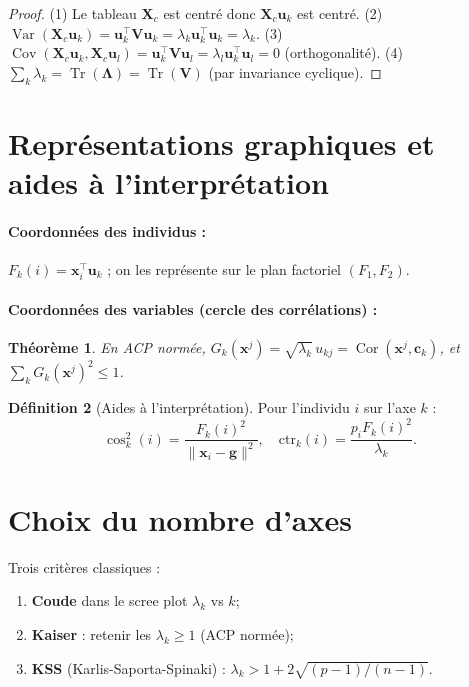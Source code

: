 \documentclass[11pt, a4paper, openany]{book}
\theoremstyle{plain}
\newtheorem{theorem}{Théorème}[chapter]
\theoremstyle{definition}
\newtheorem{definition}[theorem]{Définition}
\theoremstyle{remark}
\newcommand{\1}{\mathds{1}}
\DeclareMathOperator{\Tr}{Tr}
\DeclareMathOperator{\Var}{Var}
\DeclareMathOperator{\Cov}{Cov}
\DeclareMathOperator{\Cor}{Cor}
\newcommand{\X}{\mathbf{X}}
\newcommand{\V}{\mathbf{V}}
\newcommand{\bLambda}{\mathbf{\Lambda}}
\begin{document}
\begin{proof}
(1) Le tableau $\X_c$ est centré donc $\X_c \mathbf{u}_k$ est centré.
(2) $\Var(\X_c \mathbf{u}_k) = \mathbf{u}_k^\top \V \mathbf{u}_k = \lambda_k \mathbf{u}_k^\top \mathbf{u}_k = \lambda_k$.
(3) $\Cov(\X_c \mathbf{u}_k, \X_c \mathbf{u}_l) = \mathbf{u}_k^\top \V \mathbf{u}_l = \lambda_l \mathbf{u}_k^\top \mathbf{u}_l = 0$ (orthogonalité).
(4) $\sum_k \lambda_k = \Tr(\bLambda) = \Tr(\V)$ (par invariance cyclique).
\end{proof}

\section{Représentations graphiques et aides à l'interprétation}

\paragraph{Coordonnées des individus :}
$F_k(i) = \mathbf{x}_i^\top \mathbf{u}_k$ ; on les représente sur le plan factoriel $(F_1, F_2)$.

\paragraph{Coordonnées des variables (cercle des corrélations) :}

\begin{theorem}
En ACP normée, $G_k(\mathbf{x}^j) = \sqrt{\lambda_k}\, u_{kj} = \Cor(\mathbf{x}^j, \mathbf{c}_k)$,
et $\sum_k G_k(\mathbf{x}^j)^2 \leq 1$.
\end{theorem}

\begin{definition}[Aides à l'interprétation]
Pour l'individu $i$ sur l'axe $k$ :
\[
\cos^2_k(i) = \frac{F_k(i)^2}{\|\mathbf{x}_i - \mathbf{g}\|^2}, \quad
\text{ctr}_k(i) = \frac{p_i F_k(i)^2}{\lambda_k}.
\]
\end{definition}

\section{Choix du nombre d'axes}

Trois critères classiques :
\begin{enumerate}
  \item \textbf{Coude} dans le scree plot $\lambda_k$ vs $k$;
  \item \textbf{Kaiser} : retenir les $\lambda_k \geq 1$ (ACP normée);
  \item \textbf{KSS} (Karlis-Saporta-Spinaki) : $\lambda_k > 1 + 2\sqrt{(p-1)/(n-1)}$.
\end{enumerate}
\end{document}
